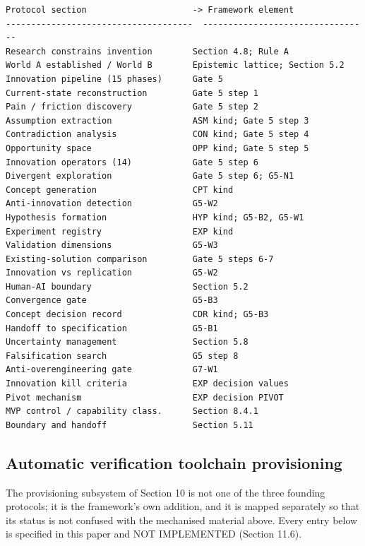 \documentclass[11pt,a4paper]{article}
\begin{document}
\begin{Verbatim}[fontsize=\footnotesize,breaklines=true,breakanywhere=true,breakautoindent=false,samepage=false]
Protocol section                     -> Framework element
-------------------------------------  ---------------------------------
Research constrains invention        Section 4.8; Rule A
World A established / World B        Epistemic lattice; Section 5.2
Innovation pipeline (15 phases)      Gate 5
Current-state reconstruction         Gate 5 step 1
Pain / friction discovery            Gate 5 step 2
Assumption extraction                ASM kind; Gate 5 step 3
Contradiction analysis               CON kind; Gate 5 step 4
Opportunity space                    OPP kind; Gate 5 step 5
Innovation operators (14)            Gate 5 step 6
Divergent exploration                Gate 5 step 6; G5-N1
Concept generation                   CPT kind
Anti-innovation detection            G5-W2
Hypothesis formation                 HYP kind; G5-B2, G5-W1
Experiment registry                  EXP kind
Validation dimensions                G5-W3
Existing-solution comparison         Gate 5 steps 6-7
Innovation vs replication            G5-W2
Human-AI boundary                    Section 5.2
Convergence gate                     G5-B3
Concept decision record              CDR kind; G5-B3
Handoff to specification             G5-B1
Uncertainty management               Section 5.8
Falsification search                 G5 step 8
Anti-overengineering gate            G7-W1
Innovation kill criteria             EXP decision values
Pivot mechanism                      EXP decision PIVOT
MVP control / capability class.      Section 8.4.1
Boundary and handoff                 Section 5.11
\end{Verbatim}

\subsection{Automatic verification toolchain provisioning}

The provisioning subsystem of Section 10 is not one of the three founding protocols; it is the framework's own addition, and it is mapped separately so that its status is not confused with the mechanised material above. Every entry below is specified in this paper and NOT IMPLEMENTED (Section 11.6).
\end{document}
